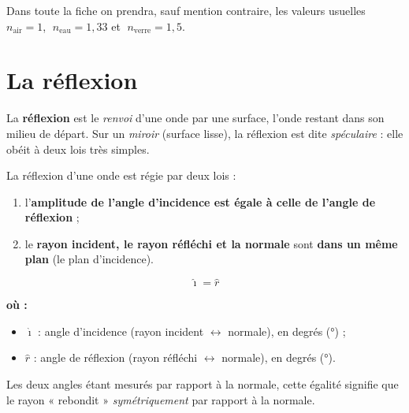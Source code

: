 \documentclass[11pt,a4paper]{article}
\newenvironment{ou}{%
  \par\smallskip\noindent\textbf{où :}\nopagebreak
  \begin{itemize}[leftmargin=1.8em,topsep=2pt,itemsep=1.5pt,parsep=0pt]}%
  {\end{itemize}}
\newcommand{\angi}{\hat{\imath}}     %
\newcommand{\angr}{\hat{r}}          %
\begin{document}
\begin{remarque}
Dans toute la fiche on prendra, sauf mention contraire, les valeurs usuelles
$n_{\text{air}} = 1$, $\;n_{\text{eau}} = 1{,}33$ et $\;n_{\text{verre}} = 1{,}5$.
\end{remarque}

\section{La réflexion}
\begin{definition}[réflexion]
La \textbf{réflexion} est le \emph{renvoi} d'une onde par une surface, l'onde restant dans son
milieu de départ. Sur un \emph{miroir} (surface lisse), la réflexion est dite \emph{spéculaire} :
elle obéit à deux lois très simples.
\end{definition}

\begin{theoreme}
La réflexion d'une onde est régie par deux lois :
\begin{enumerate}[label=(\roman*),leftmargin=2.1em,topsep=2pt]
  \item l'\textbf{amplitude de l'angle d'incidence est égale à celle de l'angle de réflexion} ;
  \item le \textbf{rayon incident, le rayon réfléchi et la normale} sont \textbf{dans un même plan}
        (le plan d'incidence).
\end{enumerate}
\end{theoreme}

\begin{formule}
\[ \boxed{\,\angi = \angr\,} \]
\begin{ou}
  \item $\angi$ : angle d'incidence (rayon incident $\leftrightarrow$ normale), en degrés (\si{\degree}) ;
  \item $\angr$ : angle de réflexion (rayon réfléchi $\leftrightarrow$ normale), en degrés (\si{\degree}).
\end{ou}
Les deux angles étant mesurés par rapport à la normale, cette égalité signifie que le rayon
« rebondit » \emph{symétriquement} par rapport à la normale.
\end{formule}
\end{document}
